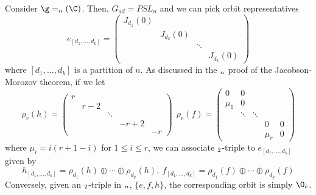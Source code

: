 \begin{ex}
  Consider \(\g = \sl_n(\C)\). Then, \(G_{ad} = PSL_n\) and we can
  pick orbit representatives \[
    e_{[d_1, \ldots, d_k]} = \left(
      \begin{array}{cccc}
        J_{d_1}(0)&&& \\
                  &J_{d_2}(0)&& \\
                  &&\ddots& \\
        &&&J_{d_k}(0)
      \end{array}
\right)
\]
  where \([d_1, \ldots, d_k]\) is a partition of \(n\). As discussed
  in the \(\sl_n\) proof of the Jacobson-Morozov theorem, if we
  let \[
    \rho_r(h) = \left(
      \begin{array}{ccccc}
        r&&&&\\
         &r-2&&&\\
         &&\ddots&&\\
         &&&-r+2&\\
        &&&&-r
      \end{array}
\right) \ \ \rho_r(f) = \left(
  \begin{array}{ccccc}
    0&0&&&\\
    \mu_1&0&&&\\
     &\ddots&\ddots&& \\
     &&&0&0\\
    &&&\mu_r&0
  \end{array}
\right)
\]
  where \(\mu_i = i(r+1-i)\) for \(1 \leq i \leq r\), we can associate
  \(\sl_2\)-triple to \(e_{[d_1, \ldots, d_k]}\) given by \[
    h_{[d_1, \ldots, d_k]} = \rho_{d_1}(h) \oplus \cdots \oplus
    \rho_{d_k}(h), \ f_{[d_1, \ldots, d_k]} = \rho_{d_1}(f) \oplus
    \cdots \oplus \rho_{d_k}(f)
  \]
  Conversely, given an \(\sl_2\)-triple in \(\sl_n\), \(\{e,f,h\}\),
  the corresponding orbit is simply \(\O_e\).
\end{ex}

